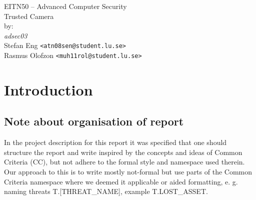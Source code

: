 \documentclass[10pt]{article}
\begin{document}

  \thispagestyle{empty}
  \vspace*{3cm}
  \begin{center}
    \huge{EITN50 -- Advanced Computer Security} \\
    \vspace{0.3cm}
    \LARGE{Trusted Camera} \\
    \vspace{1cm}
    \large{by: \\ \vspace{0.2cm}
	\textit{adsec03} \\
        Stefan Eng \texttt{<atn08sen@student.lu.se>} \\
        Rasmus Olofzon \texttt{<muh11rol@student.lu.se>}
        } \\
  \end{center}


  \newpage

  \section{Introduction}



    \subsection{Note about organisation of report}
      { \footnotesize In the project description for this report it was specified that one should 
      structure the report and write inspired by the concepts and ideas of Common Criteria (CC),
	but not adhere to the formal style and namespace used therein. 
	Our approach to this is to write mostly not-formal but use parts of
	the Common Criteria namespace where we deemed it applicable or aided formatting, 
	e. g. naming threats T.[THREAT\_NAME], example T.LOST\_ASSET. }
\end{document}
